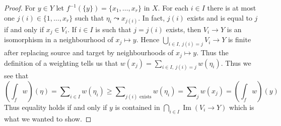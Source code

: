 \documentclass{amsart}
\theoremstyle{plain}
\theoremstyle{definition}
\theoremstyle{remark}
\numberwithin{equation}{subsection}
\def\Im{\mathop{\mathrm{Im}}}
\begin{document}
\begin{proof}
\medskip\noindent
For $y \in Y$ let $f^{-1}(\{y\}) = \{x_1, \ldots, x_r\}$ in $X$.
For each $i \in I$ there is at most one $j(i) \in \{1, \ldots, x_r\}$
such that $\eta_i \leadsto x_{j(i)}$. In fact, $j(i)$ exists and is
equal to $j$ if and only if $x_j \in V_i$. If $i \in I$ is such that
$j = j(i)$ exists, then $V_i \to Y$ is an isomorphism in a neighbourhood
of $x_j \mapsto y$. Hence $\bigcup_{i \in I,\ j(i) = j} V_i \to Y$
is finite after replacing source and target by neighbourhoods of
$x_j \mapsto y$. Thus the definition of a weighting tells us that
$w(x_j) = \sum_{i \in I,\ j(i) = j} w(\eta_i)$.
Thus we see that
$$
(\textstyle{\int}_f w)(\eta) =
\sum\nolimits_{i \in I} w(\eta_i) \geq
\sum\nolimits_{j(i)\text{ exists}} w(\eta_i) =
\sum\nolimits_j w(x_j) = (\textstyle{\int}_f w)(y)
$$
Thus equality holds if and only if $y$ is contained in
$\bigcap_{i \in I} \Im(V_i \to Y)$ which is what we wanted to show.
\end{proof}
\end{document}
